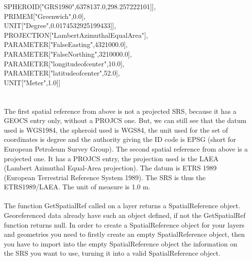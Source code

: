 \documentclass {article}
\begin{document}
\hspace*{6mm} SPHEROID["GRS\underline{\space}1980",6378137.0,298.257222101]],\\
\hspace*{4mm} PRIMEM["Greenwich",0.0],\\
\hspace*{4mm} UNIT["Degree",0.0174532925199433]],\\
\hspace*{2mm} PROJECTION["Lambert\underline{\space}Azimuthal\underline{\space}Equal\underline{\space}Area"],\\
 \hspace*{2mm}   PARAMETER["False\underline{\space}Easting",4321000.0],\\
 \hspace*{2mm}   PARAMETER["False\underline{\space}Northing",3210000.0],\\
 \hspace*{2mm}   PARAMETER["longitude\underline{\space}of\underline{\space}center",10.0],\\
 \hspace*{2mm}   PARAMETER["latitude\underline{\space}of\underline{\space}center",52.0],\\
 \hspace*{2mm}   UNIT["Meter",1.0]]\\
\\
\\
The first spatial reference from above is not a projected SRS, because it has a GEOCS entry only, without a PROJCS one. But, we can still see that the datum used is WGS1984, the spheroid used is WGS84, the unit used for the set of coordinates is degree and the authority giving the ID code is EPSG (short for European Petroleum Survey Group).  
The second spatial reference from above is a projected one. It has a PROJCS entry, the projection used is the LAEA (Lambert Azimuthal Equal-Area projection). The datum is ETRS 1989 (European Terrestrial Reference System 1989). The SRS is thus the ETRS1989/LAEA. The unit of measure is 1.0 m. 
\\
\\
The function GetSpatialRef called on a layer returns a SpatialReference object. Georeferenced data already have such an object defined, if not the GetSpatialRef function returns null. In order to create a SpatialReference object for your layers and geometries you need to firstly create an empty SpatialReference object, then you have to import into the empty SpatialReference object the information on the SRS you want to use, turning it into a valid SpatialReference object.        
 
\end{document}
